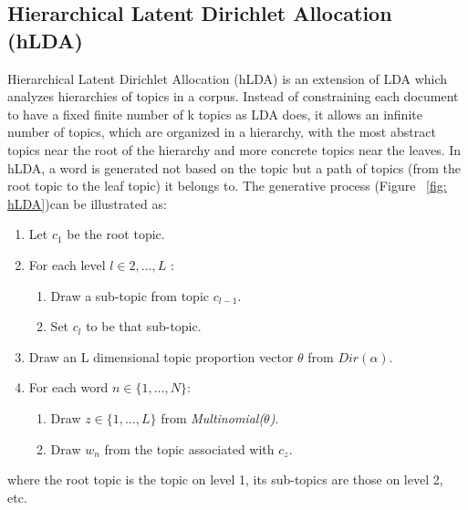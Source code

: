 \documentclass[DIV=calc, paper=letter, fontsize=10pt, twocolumn]{scrartcl}	 %
\begin{document}
\subsection*{Hierarchical Latent Dirichlet Allocation (hLDA)}
Hierarchical Latent Dirichlet Allocation (hLDA) \cite{2} is an extension of LDA which analyzes hierarchies of topics in a corpus. Instead of constraining each document to have a fixed finite number of k topics as LDA does, it allows an infinite number of topics, which are organized in a hierarchy, with the most abstract topics near the root of the hierarchy and more concrete topics near the leaves. In hLDA, a word is generated not based on the topic but a path of topics (from the root topic to the leaf topic) it belongs to.\newline
The generative process (Figure ~\ref{fig: hLDA})can be illustrated as:
\begin{enumerate}
  \item Let $c_1$ be the root topic.
  \item For each level $l \in 2,\ldots, L$ :
  	\begin{enumerate}
		\item Draw a sub-topic from topic $c_{l - 1}$.
		\item Set $c_l$ to be that sub-topic.
	\end{enumerate}

  \item Draw an L dimensional topic proportion vector $\theta$ from $Dir(\alpha)$.
  \item For each word $n \in \{ 1, \ldots, N \}$:
  	\begin{enumerate}
  	  	\item Draw $z \in \{ 1, \ldots, L \}$ from {\it Multinomial($\theta$)}.
    		\item Draw $w_n$ from the topic associated with $c_z$.
  	\end{enumerate}
\end{enumerate}
where the root topic is the topic on level 1, its sub-topics are those on level 2, etc.
\end{document}
